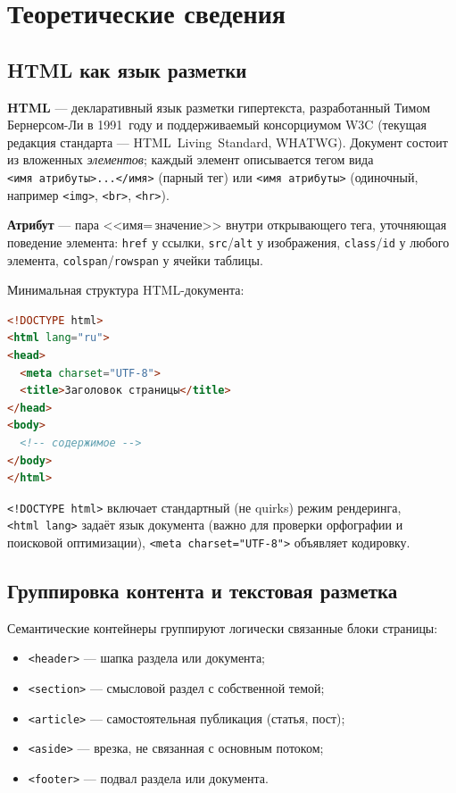 \chapter{Теоретические сведения}
\label{ch:theory}

\section{HTML как язык разметки}

\textbf{HTML} — декларативный язык разметки гипертекста, разработанный
Тимом Бернерсом-Ли в 1991~году и поддерживаемый консорциумом W3C
(текущая редакция стандарта --- HTML~Living~Standard, WHATWG). Документ
состоит из вложенных \emph{элементов}; каждый элемент описывается тегом
вида \texttt{<имя~атрибуты>...</имя>} (парный тег) или
\texttt{<имя~атрибуты>} (одиночный, например \texttt{<img>},
\texttt{<br>}, \texttt{<hr>}).

\textbf{Атрибут} — пара <<имя=\,значение>> внутри открывающего тега,
уточняющая поведение элемента: \texttt{href} у ссылки,
\texttt{src}/\texttt{alt} у изображения, \texttt{class}/\texttt{id} у
любого элемента, \texttt{colspan}/\texttt{rowspan} у ячейки таблицы.

Минимальная структура HTML-документа:
\begin{lstlisting}[language=HTML]
<!DOCTYPE html>
<html lang="ru">
<head>
  <meta charset="UTF-8">
  <title>Заголовок страницы</title>
</head>
<body>
  <!-- содержимое -->
</body>
</html>
\end{lstlisting}

\texttt{<!DOCTYPE~html>} включает стандартный (не quirks) режим
рендеринга, \texttt{<html~lang>} задаёт язык документа (важно для
проверки орфографии и поисковой оптимизации),
\texttt{<meta~charset="UTF-8">} объявляет кодировку.

\section{Группировка контента и текстовая разметка}

Семантические контейнеры группируют логически связанные блоки
страницы:
\begin{itemize}
  \item \texttt{<header>} --- шапка раздела или документа;
  \item \texttt{<section>} --- смысловой раздел с собственной темой;
  \item \texttt{<article>} --- самостоятельная публикация (статья,
        пост);
  \item \texttt{<aside>} --- врезка, не связанная с основным
        потоком;
  \item \texttt{<footer>} --- подвал раздела или документа.
\end{itemize}

